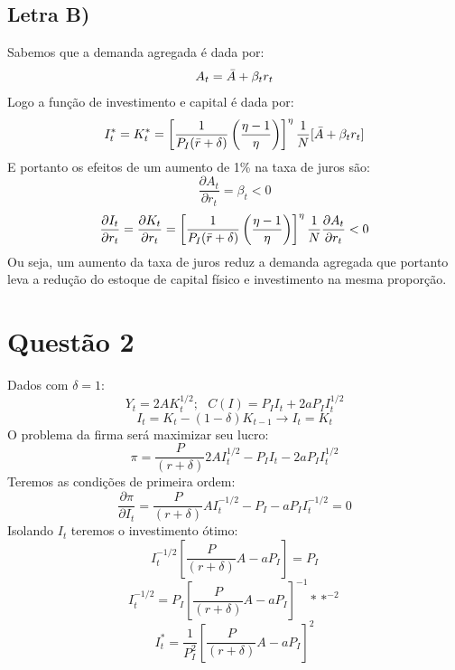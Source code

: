 \documentclass{article}
\begin{document}
\subsection*{Letra B)}
Sabemos que a demanda agregada é dada por:
\begin{equation}
    A_t = \Bar{A}+\beta_t r_t
\end{equation}
Logo a função de investimento e capital é dada por:
\begin{equation}
I_t^*=K_t^*=\left[\frac{1}{P_I(\Bar{r}+\delta)}\left(\frac{\eta -1}{\eta}\right)\right]^\eta \frac{1}{N} [\Bar{A}+\beta_t r_t]
\end{equation}
E portanto os efeitos de um aumento de 1\% na taxa de juros são:
\begin{equation}
    \frac{\partial A_t}{\partial r_t} = \beta_t < 0
\end{equation}
\begin{equation}
    \frac{\partial I_t}{\partial r_t} = \frac{\partial K_t}{\partial r_t} =\left[\frac{1}{P_I(\Bar{r}+\delta)}\left(\frac{\eta -1}{\eta}\right)\right]^\eta \frac{1}{N} \frac{\partial A_t}{\partial r_t} < 0 
\end{equation}
Ou seja, um aumento da taxa de juros reduz a demanda agregada que portanto leva a redução do estoque de capital físico e investimento na mesma proporção.

\section*{Questão 2}
Dados com $\delta=1$:
$$
Y_t = 2AK_t^{1/2}; \>\>\> C(I) = P_I I_t + 2aP_I I_t^{1/2}
$$
$$ I_t = K_t - (1-\delta)K_{t-1} \to I_t = K_t$$
O problema da firma será maximizar seu lucro:
\begin{equation}
    \pi = \frac{P}{(r+\delta)}2AI_t^{1/2} - P_I I_t - 2a P_I I_t^{1/2}
\end{equation}
Teremos as condições de primeira ordem:
\begin{equation}
    \frac{\partial \pi}{\partial I_t} = \frac{P}{(r+\delta)}AI_t^{-1/2} - P_I - a P_I I_t^{-1/2} = 0
\end{equation}
Isolando $I_t$ teremos o investimento ótimo:
\begin{equation}
    I_t^{-1/2}\left[\frac{P}{(r+\delta)}A - a P_I \right] = P_I 
\end{equation}
\begin{equation}
    I_t^{-1/2} = P_I \left[\frac{P}{(r+\delta)}A - a P_I \right]^{-1} **^{-2}
\end{equation}
\begin{equation}
    I_t^* = \frac{1}{P_I^2} \left[\frac{P}{(r+\delta)}A - a P_I \right]^{2}
\end{equation}
\end{document}
